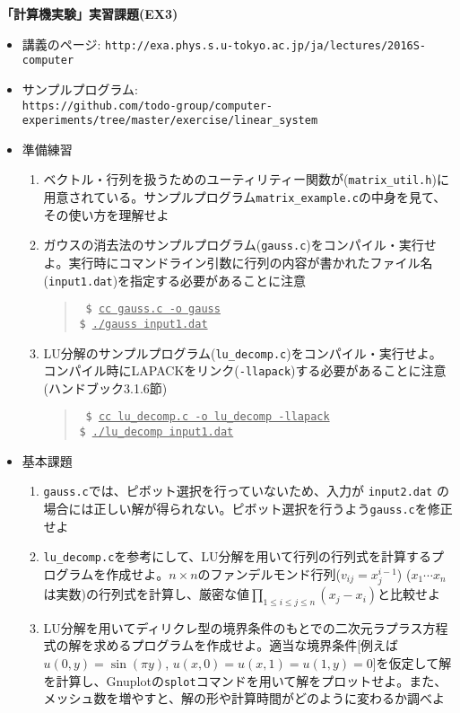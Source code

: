 \documentclass[11pt]{jarticle}
\begin{document}
\noindent
{\bf\large 「計算機実験」実習課題(EX3)}
\\[-0.5em]

\noindent
\begin{itemize}
\item 講義のページ: \verb+http://exa.phys.s.u-tokyo.ac.jp/ja/lectures/2016S-computer+

\item サンプルプログラム: \\ \verb+https://github.com/todo-group/computer-experiments/tree/master/exercise/linear_system+
  
\item 準備練習
  \begin{enumerate}
  \item ベクトル・行列を扱うためのユーティリティー関数が({\tt matrix\_util.h})に用意されている。サンプルプログラム{\tt matrix\_example.c}の中身を見て、その使い方を理解せよ
  \item ガウスの消去法のサンプルプログラム({\tt gauss.c})をコンパイル・実行せよ。実行時にコマンドライン引数に行列の内容が書かれたファイル名({\tt input1.dat})を指定する必要があることに注意
    \begin{quote} \tt
      \$ \underline{cc gauss.c -o gauss} \\
      \$ \underline{./gauss input1.dat}
    \end{quote}
  \item LU分解のサンプルプログラム({\tt lu\_decomp.c})をコンパイル・実行せよ。コンパイル時にLAPACKをリンク({\tt -llapack})する必要があることに注意(ハンドブック3.1.6節)
    \begin{quote} \tt
      \$ \underline{cc lu\_decomp.c -o lu\_decomp -llapack} \\
      \$ \underline{./lu\_decomp input1.dat}
    \end{quote}
  \end{enumerate}

\item 基本課題
  \begin{enumerate}
  \item {\tt gauss.c}では、ピボット選択を行っていないため、入力が {\tt input2.dat} の場合には正しい解が得られない。ピボット選択を行うよう{\tt gauss.c}を修正せよ
  \item {\tt lu\_decomp.c}を参考にして、LU分解を用いて行列の行列式を計算するプログラムを作成せよ。$n \times n$のファンデルモンド行列($v_{ij}=x_j^{i-1}$) ($x_1 \cdots x_n$は実数)の行列式を計算し、厳密な値$\displaystyle \prod_{1 \le i \le j \le n} (x_j-x_i)$と比較せよ
  \item LU分解を用いてディリクレ型の境界条件のもとでの二次元ラプラス方程式の解を求めるプログラムを作成せよ。適当な境界条件[例えば$u(0,y) = \sin(\pi y)$, $u(x,0)=u(x,1)=u(1,y)=0$]を仮定して解を計算し、Gnuplotの{\tt splot}コマンドを用いて解をプロットせよ。また、メッシュ数を増やすと、解の形や計算時間がどのように変わるか調べよ
  \end{enumerate}
  

\end{itemize}
\end{document}
